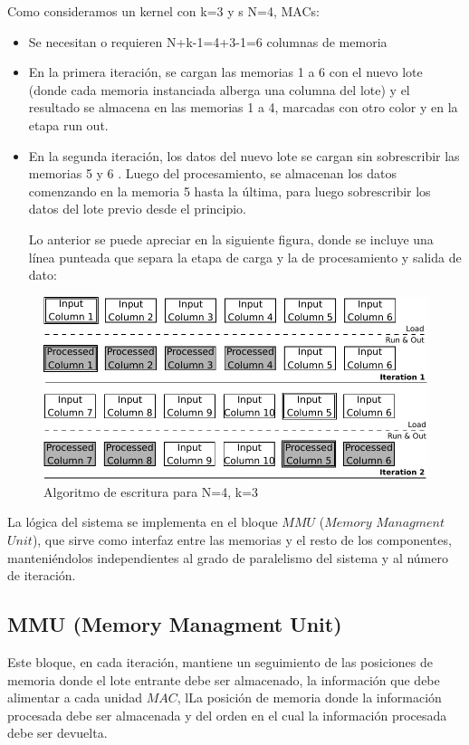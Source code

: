 \documentclass[a4paper]{article}
\begin{document}
Como consideramos un kernel con k=3 y s N=4, MACs:
\begin{frame}{}
	    
      \begin{itemize}
        \item Se necesitan o requieren N+k-1=4+3-1=6 columnas de memoria
	\item En la primera iteración, se cargan las memorias 1 a 6 con el nuevo lote (donde cada memoria instanciada alberga una columna del lote) y el resultado se almacena en las memorias 1 a 4, marcadas con otro color y en la etapa run  out.
	\item En la segunda iteración, los datos del nuevo lote se cargan sin sobrescribir las memorias 5 y 6 . Luego del procesamiento, se almacenan los datos comenzando en la memoria  5 hasta la última, para luego sobrescribir los datos del lote previo desde el principio.

\bigskip
\bigskip
Lo anterior se puede apreciar en la siguiente figura, donde se incluye una línea punteada que separa la etapa de carga y la de procesamiento y salida de dato:

\end{itemize}
\end{frame}

\begin{figure}[H]
\centering
\includegraphics[scale=0.8]{algorithm}
\caption{Algoritmo de escritura para N=4, k=3 }
\label{writingprocess}
\end{figure}


La lógica del sistema se implementa en el bloque $MMU$ ($Memory$ $Managment$ $Unit$), que sirve como interfaz entre las memorias y el resto de los componentes, 
manteniéndolos independientes al grado de paralelismo del sistema y al número de iteración.

\bigskip

\subsection {MMU (Memory Managment Unit) }
Este bloque, en cada iteración, mantiene un seguimiento de las posiciones de memoria donde el lote entrante debe ser almacenado,
la información que debe alimentar a cada unidad $MAC$, lLa posición de memoria donde la información procesada debe ser almacenada
y del orden en el cual la información procesada debe ser devuelta.
\end{document}
